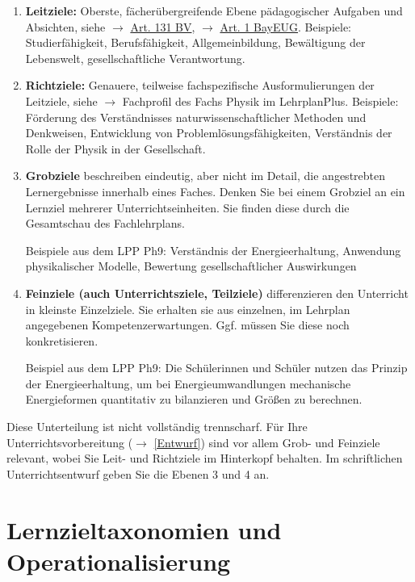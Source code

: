 \begin{enumerate}
	\item \textbf{Leitziele:} Oberste, fächerübergreifende Ebene pädagogischer Aufgaben und Absichten, siehe $\to$ \href{https://www.gesetze-bayern.de/Content/Document/BayVerf-131}{Art. 131 BV}, $\to$ \href{https://www.gesetze-bayern.de/Content/Document/BayEUG-1}{Art. 1 BayEUG}.
	\mip
	Beispiele: Studierf\"{a}higkeit, Berufsf\"{a}higkeit, Allgemeinbildung, Bew\"{a}ltigung der Lebenswelt, gesellschaftliche Verantwortung.

	\item \textbf{Richtziele:} Genauere, teilweise fachspezifische Ausformulierungen der Leitziele, siehe $\to$ Fachprofil des Fachs Physik im LehrplanPlus.
	\mip
	Beispiele: Förderung des Verständnisses naturwissenschaftlicher Methoden und Denkweisen, Entwicklung von Problemlösungsfähigkeiten, Verständnis der Rolle der Physik in der Gesellschaft.

	\item \textbf{Grobziele} beschreiben eindeutig, aber nicht im Detail, die angestrebten Lernergebnisse innerhalb eines Faches. Denken Sie bei einem Grobziel an ein Lernziel mehrerer Unterrichtseinheiten. Sie finden diese durch die Gesamtschau des Fachlehrplans.

	\mip
	Beispiele aus dem LPP Ph9: Verständnis der Energieerhaltung, Anwendung physikalischer Modelle, Bewertung gesellschaftlicher Auswirkungen

	\item \textbf{Feinziele (auch Unterrichtsziele, Teilziele)} differenzieren den Unterricht in kleinste Einzelziele. Sie erhalten sie aus einzelnen, im Lehrplan angegebenen Kompetenzerwartungen. Ggf. müssen Sie diese noch konkretisieren.

	\mip
	Beispiel aus dem LPP Ph9: Die Schülerinnen und Schüler nutzen das Prinzip der Energieerhaltung, um bei Energieumwandlungen mechanische Energieformen quantitativ zu bilanzieren und Größen zu berechnen.
\end{enumerate}

Diese Unterteilung ist nicht vollständig trennscharf. Für Ihre Unterrichtsvorbereitung ($\to$ \cref{Entwurf}) sind vor allem Grob- und Feinziele relevant, wobei Sie Leit- und Richtziele im Hinterkopf behalten. Im schriftlichen Unterrichtsentwurf geben Sie die Ebenen 3 und 4 an.

\section{Lernzieltaxonomien und Operationalisierung}

